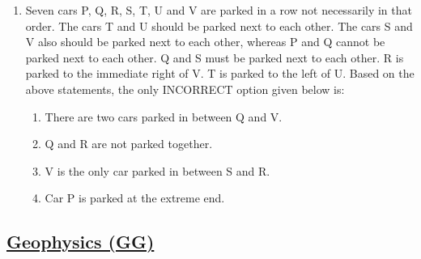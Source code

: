 \documentclass[journal,12pt,onecolumn]{IEEEtran}
\theoremstyle{remark}
\begin{document}
\begin{enumerate}
    \item Seven cars P, Q, R, S, T, U and V are parked in a row not necessarily in that order. The cars T and U should be parked next to each other. The cars S and V also should be parked next to each other, whereas P and Q cannot be parked next to each other. Q and S must be parked next to each other. R is parked to the immediate right of V. T is parked to the left of U. Based on the above statements, the only INCORRECT option given below is: \hfill{}
        \begin{enumerate}
            \item There are two cars parked in between Q and V.
            \item Q and R are not parked together.
            \item V is the only car parked in between S and R.
            \item Car P is parked at the extreme end.
        \end{enumerate}
    \end{enumerate}
\begin{center}
    \section*{\underline{Geophysics (GG)}}
\end{center}
    
\end{document}
